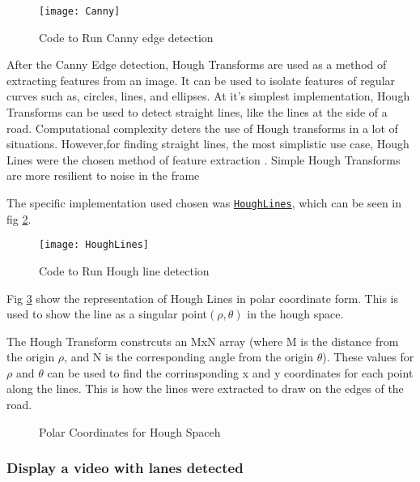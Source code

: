 \documentclass[conference]{IEEEtran}
\begin{document}
\begin{figure}[H]
\centerline{\texttt{[image: Canny]}}
\caption{Code to Run Canny edge detection}
\label{fig:Canny}
\end{figure}

After the Canny Edge detection, Hough Transforms are used as a method of extracting features from an image. It can be used to isolate features of regular curves such as, circles, lines, and ellipses. At it's simplest implementation, Hough Transforms can be used to detect straight lines, like the lines at the side of a road. Computational complexity deters the use of Hough transforms in a lot of situations. However,for finding straight lines, the most simplistic use case, Hough Lines were the chosen method of feature extraction \cite{Hough_Transform}. Simple Hough Transforms are more resilient to noise in the frame \cite{Hough_Lines_Better_Against_Noise}

The specific implementation used chosen was \href{https://docs.opencv.org/3.4/d9/db0/tutorial_hough_lines.html}{\texttt{HoughLines}}, which can be seen in fig \ref{fig:HoughLines}.

\begin{figure}[H]
\centerline{\texttt{[image: HoughLines]}}
\caption{Code to Run Hough line detection}
\label{fig:HoughLines}
\end{figure}

Fig \ref{fig:Polar_Coordinates_for_Hough_transforms} show the representation of Hough Lines in polar coordinate form. This is used to show the line as a singular point$(\rho, \theta)$ in the hough space. 

The Hough Transform constrcuts an MxN array (where M is the distance from the origin $\rho$, and N is the corresponding angle from the origin $\theta$). These values for $\rho$ and $\theta$ can be used to find the corrinsponding x and y coordinates for each point along the lines. This is how the lines were extracted to draw on the edges of the road. 

\begin{figure}[H]
\centering
{}
\caption{Polar Coordinates for Hough Spaceh}
\label{fig:Polar_Coordinates_for_Hough_transforms}
\end{figure} 

\subsubsection{Display a video with lanes detected}
\end{document}
